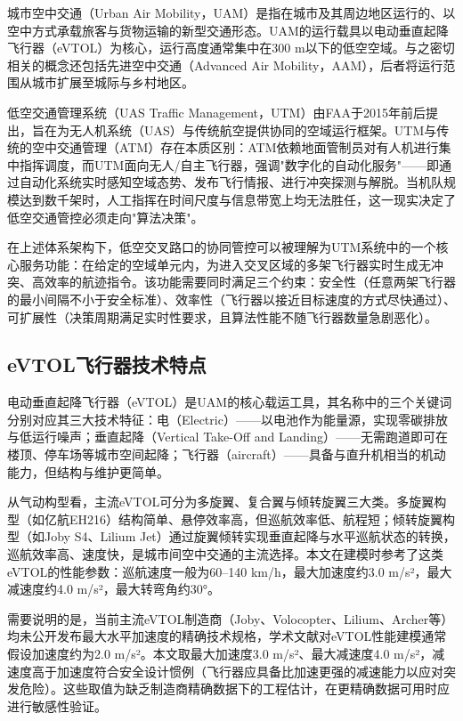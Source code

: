 \documentclass[12pt,a4paper,UTF8]{ctexbook}
\begin{document}
城市空中交通（Urban Air Mobility，UAM）是指在城市及其周边地区运行的、以空中方式承载旅客与货物运输的新型交通形态\cite{ref45}。UAM的运行载具以电动垂直起降飞行器（eVTOL）为核心，运行高度通常集中在300 m以下的低空空域。与之密切相关的概念还包括先进空中交通（Advanced Air Mobility，AAM），后者将运行范围从城市扩展至城际与乡村地区。

低空交通管理系统（UAS Traffic Management，UTM）由FAA于2015年前后提出，旨在为无人机系统（UAS）与传统航空提供协同的空域运行框架。UTM与传统的空中交通管理（ATM）存在本质区别：ATM依赖地面管制员对有人机进行集中指挥调度，而UTM面向无人/自主飞行器，强调"数字化的自动化服务"——即通过自动化系统实时感知空域态势、发布飞行情报、进行冲突探测与解脱。当机队规模达到数千架时，人工指挥在时间尺度与信息带宽上均无法胜任，这一现实决定了低空交通管控必须走向"算法决策"。

在上述体系架构下，低空交叉路口的协同管控可以被理解为UTM系统中的一个核心服务功能：在给定的空域单元内，为进入交叉区域的多架飞行器实时生成无冲突、高效率的航迹指令。该功能需要同时满足三个约束：安全性（任意两架飞行器的最小间隔不小于安全标准）、效率性（飞行器以接近目标速度的方式尽快通过）、可扩展性（决策周期满足实时性要求，且算法性能不随飞行器数量急剧恶化）。

\subsection{eVTOL飞行器技术特点}

电动垂直起降飞行器（eVTOL）是UAM的核心载运工具，其名称中的三个关键词分别对应其三大技术特征：电（Electric）——以电池作为能量源，实现零碳排放与低运行噪声；垂直起降（Vertical Take-Off and Landing）——无需跑道即可在楼顶、停车场等城市空间起降；飞行器（aircraft）——具备与直升机相当的机动能力，但结构与维护更简单。

从气动构型看，主流eVTOL可分为多旋翼、复合翼与倾转旋翼三大类\cite{ref25}。多旋翼构型（如亿航EH216）结构简单、悬停效率高，但巡航效率低、航程短；倾转旋翼构型（如Joby S4、Lilium Jet）通过旋翼倾转实现垂直起降与水平巡航状态的转换，巡航效率高、速度快，是城市间空中交通的主流选择。本文在建模时参考了这类eVTOL的性能参数：巡航速度一般为60--140 km/h，最大加速度约3.0 m/s²，最大减速度约4.0 m/s²，最大转弯角约30°。

需要说明的是，当前主流eVTOL制造商（Joby、Volocopter、Lilium、Archer等）均未公开发布最大水平加速度的精确技术规格，学术文献对eVTOL性能建模通常假设加速度约为2.0 m/s²\cite{ref25}。本文取最大加速度3.0 m/s²、最大减速度4.0 m/s²，减速度高于加速度符合安全设计惯例（飞行器应具备比加速更强的减速能力以应对突发危险）。这些取值为缺乏制造商精确数据下的工程估计，在更精确数据可用时应进行敏感性验证。
\end{document}
